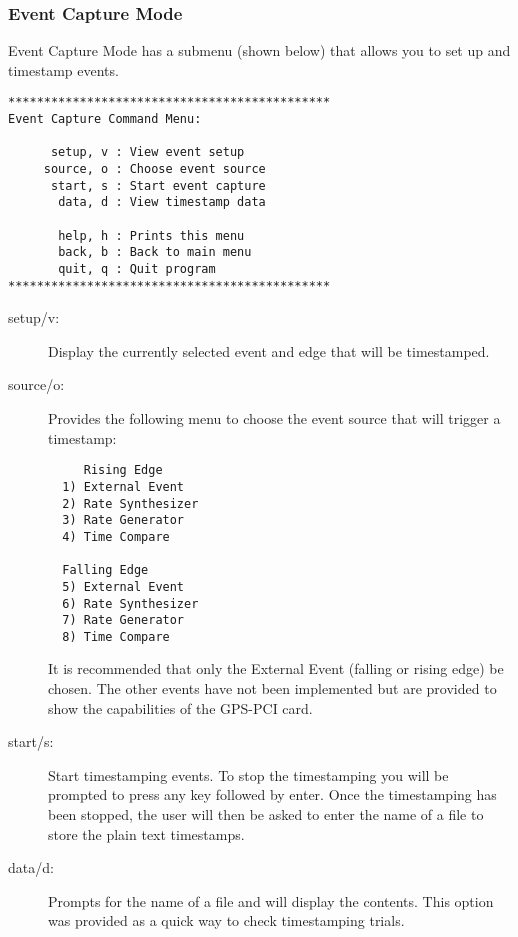 \documentclass[11pt]{article}
\begin{document}
    \subsubsection{Event Capture Mode} \label{eventcap}
    Event Capture Mode has a submenu (shown below) that allows you to set up and timestamp events.
    \begin{verbatim}
*********************************************
Event Capture Command Menu:

      setup, v : View event setup
     source, o : Choose event source
      start, s : Start event capture
       data, d : View timestamp data

       help, h : Prints this menu
       back, b : Back to main menu
       quit, q : Quit program
*********************************************
    \end{verbatim}
    \begin{description}
        \item [setup/v:] Display the currently selected event and edge that will be timestamped.
        \item [source/o:] Provides the following menu to choose the event source that will trigger a timestamp:
        \begin{verbatim}
     Rising Edge
  1) External Event
  2) Rate Synthesizer
  3) Rate Generator
  4) Time Compare

  Falling Edge
  5) External Event
  6) Rate Synthesizer
  7) Rate Generator
  8) Time Compare

        \end{verbatim}
        It is recommended that only the External Event (falling or rising edge) be chosen. The other events have not been implemented but are provided to show the capabilities of the GPS-PCI card.
        \item [start/s:] Start timestamping events. To stop the timestamping you will be prompted to press any key followed by enter. Once the timestamping has been stopped, the user will then be asked to enter the name of a file to store the plain text timestamps.
        \item [data/d:] Prompts for the name of a file and will display the contents. This option was provided as a quick way to check timestamping trials.
    \end{description}
\end{document}
